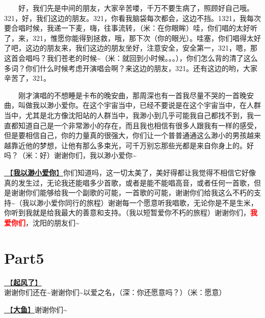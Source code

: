 \documentclass[]{ctexbook}
\begin{document}
  好，我们先是中间的朋友，大家辛苦喽，千万不要生病了，照顾好自己哦。321，好，我们这边的朋友。321，你看我脑袋每次都会，这边不挡。1321，我每次要合唱时候，我递一下麦，嗨，往事流转，（米：在你眼眸）哇，你们唱的太好听了，来，321，惟愿你能得到拯救，哦，那下次（你的眼光）。哇塞，你们唱得太好了吧，这边的朋友来，我们这边的朋友坐好，注意安全，安全第一，321，嗯，那这首会唱吗？我们苍老的时候\textasciitilde（米：就回到小时候。。。），你们怎么背的清了这么多词？你们什么时候考虑开演唱会啊？来这边的朋友，321。还有这边的哟，大家辛苦了，321。

  刚才演唱的不想睡是卡布的晚安曲，那周深也有一首我尽量不哭的一首晚安曲，叫做我以渺小爱你。在这个宇宙当中，已经不要说是在这个宇宙当中，在人群当中，尤其是北方像沈阳站的人群当中，我渺小到几乎可能我自己都找不到，我一直都知道自己是一个非常渺小的存在，而且我也相信有很多人跟我有一样的感受，但是要相信自己，你的力量真的很强大，你们让一个普普通通这么渺小的男孩越来越靠近他的梦想，让他有那么多束光，可千万别忘那些光都是来自你身上的。好吗？（米：好）谢谢你们，我以渺小爱你\textasciitilde{}

\hyperref[loving-you-in-my-humble-way]{🎵【\textbf{我以渺小爱你}】}你们知道吗，这一切太美了，美好得都让我觉得不相信它好像真的发生过，无论我还能唱多少首歌，或者是能不能唱高音，或者任何一首歌，但是谢谢你们能够给我一个副歌的可能，一首歌的可能，谢谢你们给我这么不朽的支持\textasciitilde（我以渺小爱你同行的旅程）谢谢每一个愿意听我唱歌，无论你是不是生米，你听到我就是给我最大的善意和支持。（我以短暂爱你不朽的旅程）谢谢你们，\textbf{\textcolor{red}{我爱你们}}，沈阳的朋友们\textasciitilde{}

\section{Part5}\label{shenyang-20240907-part5}

\hyperref[the-wind-rises]{🎵【\textbf{起风了}】}谢谢你们还在\textasciitilde 谢谢你们\textasciitilde 以爱之名，（深：你还愿意吗？）（米：愿意）

\hyperref[big-fish]{🎵【\textbf{大鱼}】}谢谢你们\textasciitilde{}
\end{document}
